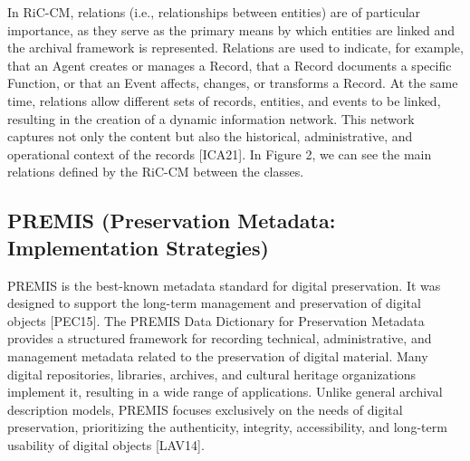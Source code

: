 \documentclass[runningheads]{llncs}
\begin{document}
	In RiC-CM, relations (i.e., relationships between entities) are of particular importance, as they serve as the primary means by which entities are linked and the archival framework is represented. Relations are used to indicate, for example, that an Agent creates or manages a Record, that a Record documents a specific Function, or that an Event affects, changes, or transforms a Record. At the same time, relations allow different sets of records, entities, and events to be linked, resulting in the creation of a dynamic information network. This network captures not only the content but also the historical, administrative, and operational context of the records [ICA21]. In Figure 2, we can see the main relations defined by the RiC-CM between the classes.
	
	
	
	\subsection{PREMIS (Preservation Metadata: Implementation Strategies)}
	
	PREMIS is the best-known metadata standard for digital preservation. It was designed to support the long-term management and preservation of digital objects [PEC15]. The PREMIS Data Dictionary for Preservation Metadata provides a structured framework for recording technical, administrative, and management metadata related to the preservation of digital material. Many digital repositories, libraries, archives, and cultural heritage organizations implement it, resulting in a wide range of applications. Unlike general archival description models, PREMIS focuses exclusively on the needs of digital preservation, prioritizing the authenticity, integrity, accessibility, and long-term usability of digital objects [LAV14]. 
	
\end{document}
